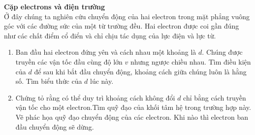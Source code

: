 \begin{vd}[*]\textbf{Cặp electrons và điện trường}\\
Ở đây chúng ta nghiên cứu chuyển động của hai electron trong mặt phẳng vuông góc với các đường sức của một từ trường đều. Hai electron được coi gần đúng như các chất điểm cổ điển và chỉ chịu tác dụng của lực điện và lực từ.
\begin{enumerate}[1)]
    \item Ban đầu hai electron đứng yên và cách nhau một khoảng là $d$. Chúng được truyền các vận tốc đầu cùng độ lớn $v$ nhưng ngược chiều nhau. Tìm điều kiện của $d$ để sau khi bắt đầu chuyển động, khoảng cách giữa chúng luôn là hằng số. Tìm biểu thức của $d$ lúc này.
    \item Chứng tỏ rằng có thể duy trì khoảng cách không đổi $d$ chỉ bằng cách truyền vận tốc cho một electron.Tìm quỹ đạo của khối tâm hệ trong trường hợp này. Vẽ phác họa quỹ đạo chuyển động của các electron. Khi nào thì electron ban đầu chuyển động sẽ dừng.
\end{enumerate}
\end{vd}
